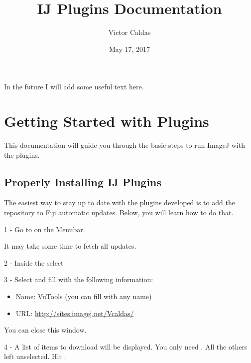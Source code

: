 \documentclass[letterpaper,10pt,english]{sphinxmanual}
\title{IJ Plugins Documentation}
\date{May 17, 2017}
\author{Victor Caldas}
\begin{document}
\maketitle
\sphinxtableofcontents
{}\label{\detokenize{index::doc}}


In the future I will add some useful text here.


\chapter{Getting Started with Plugins}
\label{\detokenize{index:getting-started-with-plugins}}\label{\detokenize{index:ij-plugins-s-documentation}}
This documentation will guide you through the basic steps to run ImageJ with the plugins.


\section{Properly Installing IJ Plugins}
\label{\detokenize{starting/instalation:properly-installing-ij-plugins}}\label{\detokenize{starting/instalation::doc}}
The easiest way to stay up to date with the plugins developed is to add the
repository to Fiji automatic updates. Below, you will learn how to do that.

1 - Go to  on the Menubar.

\noindent{}

It may take some time to fetch all updates.

2 - Inside the  select 

3 - Select  and fill with the following information:
\begin{itemize}
\item {} 
Name: VuTools (you can fill with any name)

\item {} 
URL: \url{http://sites.imagej.net/Vcaldas/}

\end{itemize}

\noindent{}

You can close this window.

4 - A list of items to download will be displayed. You only need . All the others left unselected.
Hit .
\end{document}
